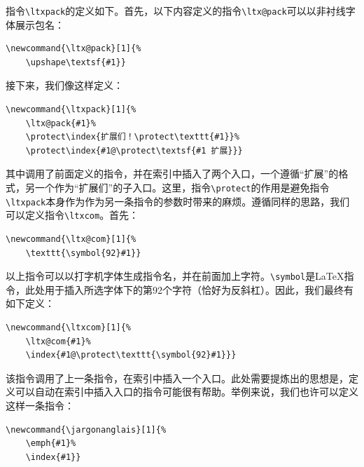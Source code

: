 指令\verb|\ltxpack|的定义如下。首先，以下内容定义的指令\verb|\ltx@pack|可以以非衬线字体展示包名：

\begin{dmd}
\begin{verbatim}
\newcommand{\ltx@pack}[1]{%
    \upshape\textsf{#1}}
\end{verbatim}
\end{dmd}

接下来，我们像这样定义：

\begin{dmd}
\begin{verbatim}
\newcommand{\ltxpack}[1]{%
    \ltx@pack{#1}% 
    \protect\index{扩展们！\protect\texttt{#1}}% 
    \protect\index{#1@\protect\textsf{#1 扩展}}}
\end{verbatim}
\end{dmd}

其中调用了前面定义的指令，并在索引中插入了两个入口，一个遵循“扩展”的格式，另一个作为“扩展们”的子入口。这里，指令\verb|\protect|的作用是避免指令\verb|\ltxpack|本身作为作为另一条指令的参数时带来的麻烦。遵循同样的思路，我们可以定义指令\verb|\ltxcom|。首先：

\begin{dmd}
\begin{verbatim}
\newcommand{\ltx@com}[1]{%
    \texttt{\symbol{92}#1}}
\end{verbatim}
\end{dmd}

以上指令可以以打字机字体生成指令名，并在前面加上字符\dm{\backslash}。\verb|\symbol|是\LaTeX 指令，此处用于插入所选字体下的第92个字符（恰好为反斜杠）。因此，我们最终有如下定义：

\begin{dmd}
\begin{verbatim}
\newcommand{\ltxcom}[1]{%
    \ltx@com{#1}% 
    \index{#1@\protect\texttt{\symbol{92}#1}}}
\end{verbatim}
\end{dmd}

该指令调用了上一条指令，在索引中插入一个入口。此处需要提炼出的思想是，定义可以自动在索引中插入入口的指令可能很有帮助。举例来说，我们也许可以定义这样一条指令：

\begin{dmd}
\begin{verbatim}
\newcommand{\jargonanglais}[1]{% 
    \emph{#1}%
    \index{#1}}
\end{verbatim}
\end{dmd}

